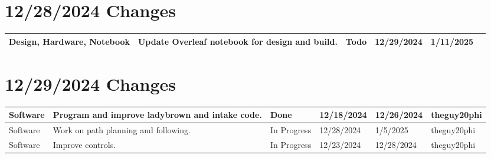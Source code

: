 \section{12/28/2024 Changes}
\begin{center}
\begin{longtable}{| p{40pt} | p{150pt} | p{35pt} | p{33pt} | p{33pt} | p{40pt} |}
\hline \rowcolor{IndianRed1}
Design, Hardware, Notebook & Update Overleaf notebook for design and build. & Todo & 12/29/2024 & 1/11/2025 & \\
\hline
\end{longtable}
\end{center}


\section{12/29/2024 Changes}
\begin{center}
\begin{longtable}{| p{40pt} | p{150pt} | p{35pt} | p{33pt} | p{33pt} | p{40pt} |}
\hline \rowcolor{DarkSeaGreen1}
Software & Program and improve ladybrown and intake code. & Done & 12/18/2024 & 12/26/2024 & theguy20phi \\
\hline \rowcolor{LightGoldenrod1}
Software & Work on path planning and following. & In Progress & 12/28/2024 & 1/5/2025 & theguy20phi \\
\hline \rowcolor{LightGoldenrod1}
Software & Improve controls. & In Progress & 12/23/2024 & 12/28/2024 & theguy20phi \\
\hline
\end{longtable}
\end{center}


